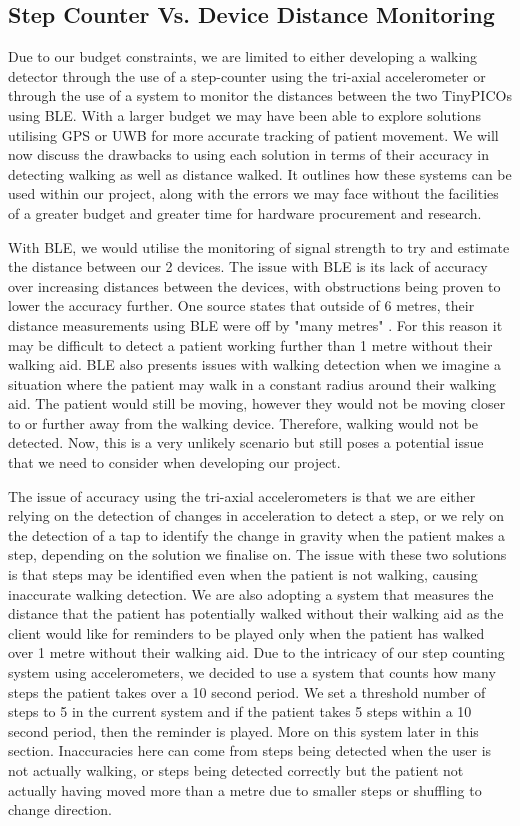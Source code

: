 {\subsection{Step Counter Vs. Device Distance Monitoring}

Due to our budget constraints, we are limited to either developing a walking detector through the use of a step-counter using the tri-axial accelerometer or through the use of a system to monitor the distances between the two TinyPICOs using BLE. With a larger budget we may have been able to explore solutions utilising GPS or UWB for more accurate tracking of patient movement. We will now discuss the drawbacks to using each solution in terms of their accuracy in detecting walking as well as distance walked. It outlines how these systems can be used within our project, along with the errors we may face without the facilities of a greater budget and greater time for hardware procurement and research.

With BLE, we would utilise the monitoring of signal strength to try and estimate the distance between our 2 devices. The issue with BLE is its lack of accuracy over increasing distances between the devices, with obstructions being proven to lower the accuracy further. One source states that outside of 6 metres, their distance measurements using BLE were off by "many metres" \cite{locatify_2020}. For this reason it may be difficult to detect a patient working further than 1 metre without their walking aid. BLE also presents issues with walking detection when we imagine a situation where the patient may walk in a constant radius around their walking aid. The patient would still be moving, however they would not be moving closer to or further away from the walking device. Therefore, walking would not be detected. Now, this is a very unlikely scenario but still poses a potential issue that we need to consider when developing our project.

The issue of accuracy using the tri-axial accelerometers is that we are either relying on the detection of changes in acceleration to detect a step, or we rely on the detection of a tap to identify the change in gravity when the patient makes a step, depending on the solution we finalise on. The issue with these two solutions is that steps may be identified even when the patient is not walking, causing inaccurate walking detection. We are also adopting a system that measures the distance that the patient has potentially walked without their walking aid as the client would like for reminders to be played only when the patient has walked over 1 metre without their walking aid. Due to the intricacy of our step counting system using accelerometers, we decided to use a system that counts how many steps the patient takes over a 10 second period. We set a threshold number of steps to 5 in the current system and if the patient takes 5 steps within a 10 second period, then the reminder is played. More on this system later in this section. Inaccuracies here can come from steps being detected when the user is not actually walking, or steps being detected correctly but the patient not actually having moved more than a metre due to smaller steps or shuffling to change direction.

}
